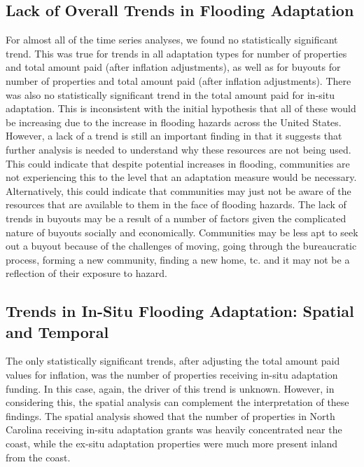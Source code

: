\documentclass[
  12pt,
]{article}
\begin{document}
\hypertarget{lack-of-overall-trends-in-flooding-adaptation}{%
\subsection{Lack of Overall Trends in Flooding
Adaptation}\label{lack-of-overall-trends-in-flooding-adaptation}}

For almost all of the time series analyses, we found no statistically
significant trend. This was true for trends in all adaptation types for
number of properties and total amount paid (after inflation
adjustments), as well as for buyouts for number of properties and total
amount paid (after inflation adjustments). There was also no
statistically significant trend in the total amount paid for in-situ
adaptation. This is inconsistent with the initial hypothesis that all of
these would be increasing due to the increase in flooding hazards across
the United States. However, a lack of a trend is still an important
finding in that it suggests that further analysis is needed to
understand why these resources are not being used. This could indicate
that despite potential increases in flooding, communities are not
experiencing this to the level that an adaptation measure would be
necessary. Alternatively, this could indicate that communities may just
not be aware of the resources that are available to them in the face of
flooding hazards. The lack of trends in buyouts may be a result of a
number of factors given the complicated nature of buyouts socially and
economically. Communities may be less apt to seek out a buyout because
of the challenges of moving, going through the bureaucratic process,
forming a new community, finding a new home, tc. and it may not be a
reflection of their exposure to hazard.

\hypertarget{trends-in-in-situ-flooding-adaptation-spatial-and-temporal}{%
\subsection{Trends in In-Situ Flooding Adaptation: Spatial and
Temporal}\label{trends-in-in-situ-flooding-adaptation-spatial-and-temporal}}

The only statistically significant trends, after adjusting the total
amount paid values for inflation, was the number of properties receiving
in-situ adaptation funding. In this case, again, the driver of this
trend is unknown. However, in considering this, the spatial analysis can
complement the interpretation of these findings. The spatial analysis
showed that the number of properties in North Carolina receiving in-situ
adaptation grants was heavily concentrated near the coast, while the
ex-situ adaptation properties were much more present inland from the
coast.
\end{document}
